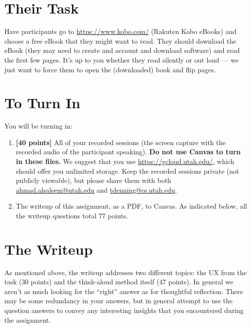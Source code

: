 \documentclass{article}
\begin{document}
\section{Their Task}
Have participants go to \href{https://www.kobo.com/}{https://www.kobo.com/} (Rakuten Kobo eBooks) and choose a free eBook that they might want to read. They should download the eBook (they may need to create and account and download software) and read the first few pages. It's up to you whether they read silently or out loud --- we just want to force them to open the (downloaded) book and flip pages.

\section{To Turn In}
You will be turning in:
\begin{enumerate}
    \item \textbf{[40 points]} All of your recorded sessions (the screen capture with the recorded audio of the participant speaking). \textbf{Do not use Canvas to turn in these files.} We suggest that you use \href{https://gcloud.utah.edu/}{https://gcloud.utah.edu/}, which should offer you unlimited storage. Keep the recorded sessions private (not publicly viewable), but please share them with both \href{mailto:ahmad.alsaleem@utah.edu}{ahmad.alsaleem@utah.edu} and \href{mailto:tdenning@cs.utah.edu}{tdenning@cs.utah.edu}.
    
    \item The writeup of this assignment, as a PDF, to Canvas. As indicated below, all the writeup questions total 77 points.
    
\end{enumerate}

\section{The Writeup}
As mentioned above, the writeup addresses two different topics: the UX from the task (30 points) and the think-aloud method itself (47 points). In general we aren't as much looking for the ``right'' answer as for thoughtful reflection. There may be some redundancy in your answers, but in general attempt to use the question answers to convey any interesting insights that you encountered during the assignment.
\end{document}
